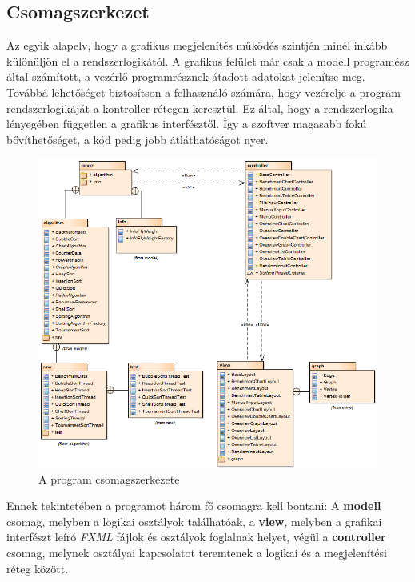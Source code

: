 \documentclass{elteikthesis}
\begin{document}
\subsection{Csomagszerkezet}
Az egyik alapelv, hogy a grafikus megjelenítés működés szintjén minél inkább különüljön el a rendszerlogikától. A grafikus felület már csak a modell programész által számított, a vezérlő programrésznek átadott adatokat jelenítse meg. Továbbá lehetőséget biztosítson a felhasználó számára, hogy vezérelje a program rendszerlogikáját a kontroller rétegen keresztül. Ez által, hogy a rendszerlogika lényegében független a grafikus interfésztől. Így a szoftver magasabb fokú bővíthetőséget, a kód pedig jobb átláthatóságot nyer.\par
 \begin{figure}[H]
 	\centering
 	\includegraphics[width=\textwidth]{pics/packagediagram.png}
 	\caption{A program csomagszerkezete}
 \end{figure}
Ennek tekintetében a programot három fő csomagra kell bontani: A \textbf{modell} csomag, melyben a logikai osztályok találhatóak, a \textbf{view}, melyben a grafikai interfészt leíró \emph{FXML} fájlok és osztályok foglalnak helyet, végül a \textbf{controller} csomag, melynek osztályai kapcsolatot teremtenek a logikai és a megjelenítési réteg között.
\end{document}

